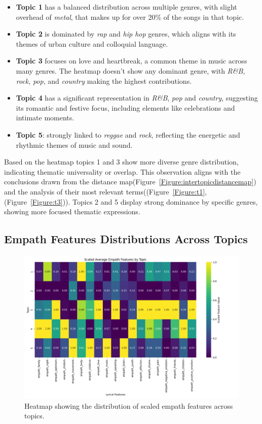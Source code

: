 \begin{itemize}
  \item \textbf{Topic 1} has a balanced distribution across multiple genres,
    with slight overhead of \textit{metal}, that makes up for over 20\% of the
    songs in that topic.
  \item \textbf{Topic 2} is dominated by \textit{rap} and \textit{hip hop} genres, which
    aligns with its themes of urban culture and colloquial language.
  \item \textbf{Topic 3} focuses on love and heartbreak, a common theme in
    music across many genres. The heatmap doesn't show any dominant genre, with
    \textit{R\&B}, \textit{rock}, \textit{pop}, and \textit{country} making the
    highest contributions.
  \item \textbf{Topic 4} has a significant representation in \textit{R\&B},
    \textit{pop} and \textit{country}, suggesting its romantic and festive
    focus, including elements like celebrations and intimate moments.
  \item \textbf{Topic 5}: strongly linked to \textit{reggae} and
    \textit{rock}, reflecting the energetic and rhythmic themes of music and
    sound.
\end{itemize}

Based on the heatmap topics 1 and 3 show more diverse genre distribution,
indicating thematic universality or overlap. This observation aligns with the
conclusions drawn from the  distance
map(Figure~\ref{Figure:intertopicdistancemap}) and the analysis of their most
relevant terms((Figure~\ref{Figure:t1}, (Figure~\ref{Figure:t3})). Topics 2 and
5 display strong dominance by specific genres, showing more focused thematic
expressions.


\subsection{Empath Features Distributions Across Topics}

\begin{center}
\begin{figure}[H]
  \centering
  \includegraphics[width=5in]{img/lda_empath_features.png}
  \caption{Heatmap showing the distribution of scaled empath features across topics.}
  \label{Figure:fig_eh}
\end{figure}
\end{center}


